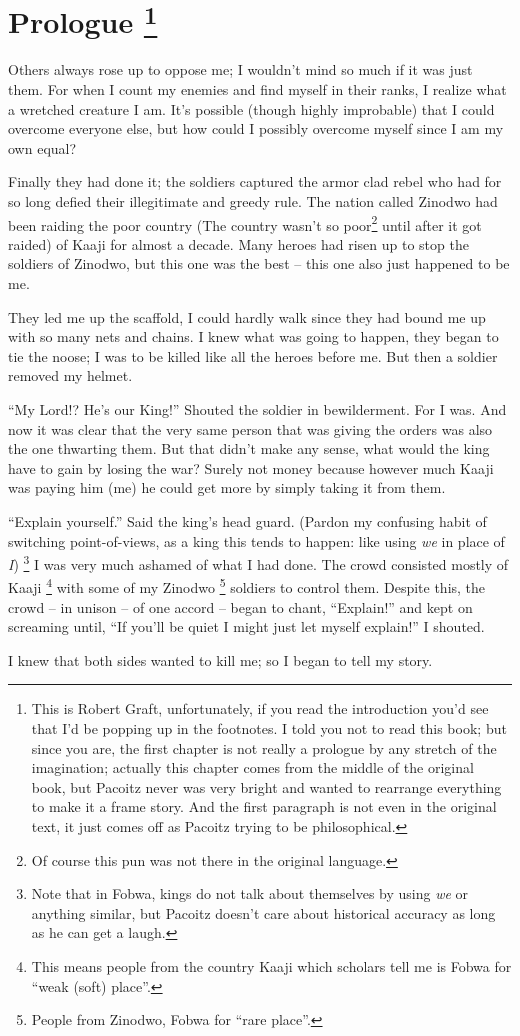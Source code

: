 \chapter[Prologue]{Prologue
\footnote{This is Robert Graft, unfortunately, if you read the introduction you'd see that I'd be popping up in the footnotes. I told you not to read this book; but since you are, the first chapter is not really a prologue by any stretch of the imagination; actually this chapter comes from the middle of the original book, but Pacoitz never was very bright and wanted to rearrange everything to make it a frame story. And the first paragraph is not even in the original text, it just comes off as Pacoitz trying to be philosophical.}
}
Others always rose up to oppose me;
I wouldn't mind so much if it was just them.
For when I count my enemies and find myself in their ranks, I realize what a wretched creature I am.
It's possible (though highly improbable) that I could overcome everyone else, but how could I possibly overcome myself since I am my own equal?

\tbreak

Finally they had done it;
the soldiers captured the armor clad rebel who had for so long defied their illegitimate and greedy rule.
The nation called Zinodwo had been raiding the poor country (The country wasn't so poor\footnote{Of course this pun was not there in the original language.} until after it got raided) of Kaaji for almost a decade.
Many heroes had risen up to stop the soldiers of Zinodwo, but this one was the best -- this one also just happened to be me.

They led me up the scaffold, I could hardly walk since they had bound me up with so many nets and chains. I knew what was going to happen, they began to tie the noose; I was to be killed like all the heroes before me. But then a soldier removed my helmet.

``My Lord!? He's our King!'' Shouted the soldier in bewilderment.
For I was.
And now it was clear that the very same person that was giving the orders was also the one thwarting them.
But that didn't make any sense, what would the king have to gain by losing the war? Surely not money because however much Kaaji was paying him (me) he could get more by simply taking it from them.

\indent ``Explain yourself.'' Said the king's head guard.
(Pardon my confusing habit of switching point-of-views, as a king this tends to happen: like using \emph{we} in place of \emph{I})
\footnote{Note that in Fo\-bwa, kings do not talk about themselves by using \emph{we} or anything similar, but Pacoitz doesn't care about historical accuracy as long as he can get a laugh.}
I was very much ashamed of what I had done.
The crowd consisted mostly of Kaaji
\footnote{This means people from the country Kaaji which scholars tell me is Fo\-bwa for ``weak (soft) place''.} with some of my Zinodwo
\footnote{People from Zinodwo, Fo\-bwa for ``rare place''.} soldiers to control them. Despite this, the crowd -- in unison -- of one accord -- began to chant, ``Explain!'' and kept on screaming until, ``If you'll be quiet I might just let myself explain!'' I shouted. 

I knew that both sides wanted to kill me; so I began to tell my story.

